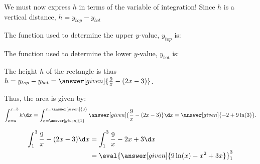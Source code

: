 \documentclass{ximera}
\begin{document}
\begin{example}
We must now express $h$ in terms of the variable of integration!  Since $h$ is a vertical distance, $h=y_{top}-y_{bot}$

The function used to determine the upper $y$-value, $y_{top}$ is:
\begin{multipleChoice}
\end{multipleChoice}

The function used to determine the lower $y$-value, $y_{bot}$ is:
\begin{multipleChoice}
\end{multipleChoice}

The height $h$ of the rectangle is thus $h=y_{top}-y_{bot} = \answer[given]{\frac{9}{x}-(2x-3)}$.

Thus, the area is given by:
  \[
 \int_{x=a}^{x=b} h \d x =  \int_{x=\answer[given]{1}}^{x=\answer[given]{3}} \answer[given]{\frac{9}{x}-(2x-3)} \d x = \answer[given]{-2+9 \ln(3)}.
  \]
  \begin{hint}
    \begin{align*}
      \int_1^3 \frac{9}{x}-(2x-3) \d x &= \int_1^3 \frac{9}{x}-2x+3 \d x\\
      &=\eval{\answer[given]{9\ln(x)-x^2+3x}}_1^3\\
    \end{align*}
  \end{hint}

\end{example}
\end{document}
